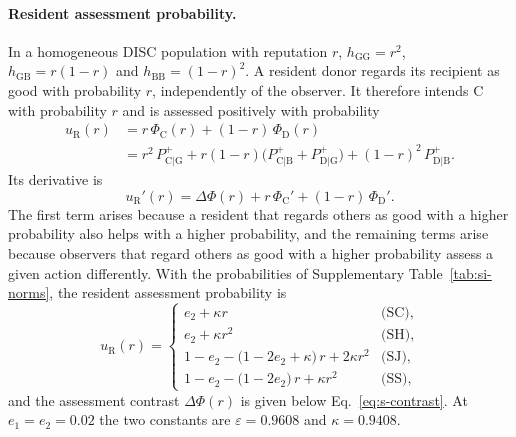 \documentclass[10pt]{wlscirep}
\newcommand{\Pp}[1]{P^{+}_{\mathrm{#1}}}   %
\newcommand{\PhiC}{\Phi_{\mathrm{C}}}
\newcommand{\PhiD}{\Phi_{\mathrm{D}}}
\theoremstyle{plain}
\theoremstyle{remark}
\begin{document}
\paragraph{Resident assessment probability.} In a homogeneous DISC population with reputation $r$, $h_{\mathrm{GG}}=r^2$, $h_{\mathrm{GB}}=r(1-r)$ and $h_{\mathrm{BB}}=(1-r)^2$. A resident donor regards its recipient as good with probability $r$, independently of the observer. It therefore intends C with probability $r$ and is assessed positively with probability
\begin{equation}
\begin{aligned}
u_{\mathrm R}(r)&=r\,\PhiC(r)+(1-r)\,\PhiD(r)\\
&=r^2\,\Pp{C|G}+r(1-r)\bigl(\Pp{C|B}+\Pp{D|G}\bigr)+(1-r)^2\,\Pp{D|B}.
\end{aligned}
\label{eq:s-resident}
\end{equation}
Its derivative is
\begin{equation}
u_{\mathrm R}'(r)=\Delta\Phi(r)+r\,\PhiC'+(1-r)\,\PhiD'.
\label{eq:s-resident-derivative}
\end{equation}
The first term arises because a resident that regards others as good with a higher probability also helps with a higher probability, and the remaining terms arise because observers that regard others as good with a higher probability assess a given action differently. With the probabilities of Supplementary Table~\ref{tab:si-norms}, the resident assessment probability is
\begin{equation}
u_{\mathrm R}(r)=\begin{cases}
e_2+\kappa r & \text{(SC)},\\
e_2+\kappa r^2 & \text{(SH)},\\
1-e_2-\bigl(1-2e_2+\kappa\bigr)\,r+2\kappa r^2 & \text{(SJ)},\\
1-e_2-\bigl(1-2e_2\bigr)\,r+\kappa r^2 & \text{(SS)},
\end{cases}
\label{eq:s-resident-norms}
\end{equation}
and the assessment contrast $\Delta\Phi(r)$ is given below Eq.~\eqref{eq:s-contrast}. At $e_1=e_2=0.02$ the two constants are $\varepsilon=0.9608$ and $\kappa=0.9408$.
\end{document}
